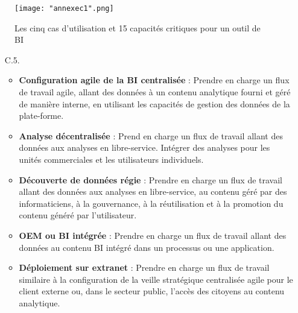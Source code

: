 \begin{figure}[!ht]\centering
\texttt{[image: "annexec1".png]}
\caption{Les cinq cas d'utilisation et 15 capacités critiques pour un outil de BI}
\label{fig:fig1}
\end{figure}
\FloatBarrier
\begin{itemize}
\item[C.5.] 
    \begin{itemize}
        \item \textbf{Configuration agile de la BI centralisée} : Prendre en charge un flux de travail agile, allant des données à un contenu analytique fourni et géré de manière interne, en utilisant les capacités de gestion des données de la plate-forme.
        \item \textbf{Analyse décentralisée } : Prend en charge un flux de travail allant des données aux analyses en libre-service. Intégrer des analyses pour les unités commerciales et les utilisateurs individuels.
        \item \textbf{Découverte de données régie} : Prendre en charge un flux de travail allant des données aux analyses en libre-service, au contenu géré par des informaticiens, à la gouvernance, à la réutilisation et à la promotion du contenu généré par l'utilisateur.
        \item \textbf{OEM ou BI intégrée} : Prendre en charge un flux de travail allant des données au contenu BI intégré dans un processus ou une application.
        \item \textbf{Déploiement sur extranet} : Prendre en charge un flux de travail similaire à la configuration de la veille stratégique centralisée agile pour le client externe ou, dans le secteur public, l'accès des citoyens au contenu analytique.
    \end{itemize}
\end{itemize}

